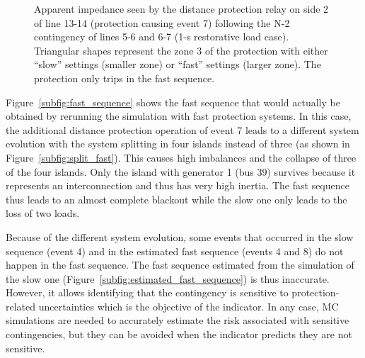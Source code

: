 \begin{figure}
\caption{Apparent impedance seen by the distance protection relay on side 2 of line 13-14 (protection causing event 7) following the N-2 contingency of lines 5-6 and 6-7 (1-s restorative load case). Triangular shapes represent the zone 3 of the protection with either ``slow'' settings (smaller zone) or ``fast'' settings (larger zone). The protection only trips in the fast sequence.}
\label{fig:IEEE_split_RX_plot}
\end{figure}

Figure~\ref{subfig:fast_sequence} shows the fast sequence that would actually be obtained by rerunning the simulation with fast protection systems. In this case, the additional distance protection operation of event 7 leads to a different system evolution with the system splitting in four islands instead of three (as shown in Figure~\ref{subfig:split_fast}). This causes high imbalances and the collapse of three of the four islands. Only the island with generator 1 (bus 39) survives because it represents an interconnection and thus has very high inertia. The fast sequence thus leads to an almost complete blackout while the slow one only leads to the loss of two loads.

Because of the different system evolution, some events that occurred in the slow sequence (event 4) and in the estimated fast sequence (events 4 and 8) do not happen in the fast sequence. The fast sequence estimated from the simulation of the slow one (Figure~\ref{subfig:estimated_fast_sequence}) is thus inaccurate. However, it allows identifying that the contingency is sensitive to protection-related uncertainties which is the objective of the indicator. In any case, MC simulations are needed to accurately estimate the risk associated with sensitive contingencies, but they can be avoided when the indicator predicts they are not sensitive.

